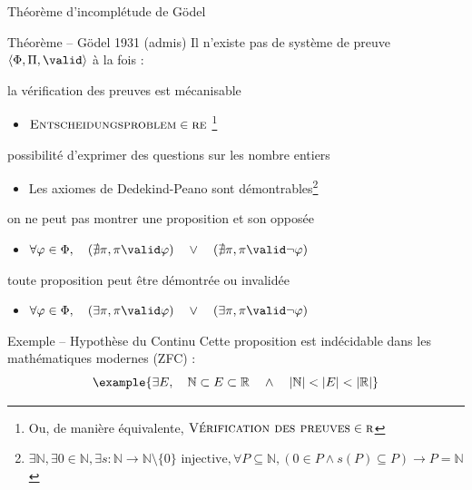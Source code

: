 
\begingroup

\begin{frame}{Théorème d'incomplétude de Gödel}

    \vspace{-2mm}
  \begin{block}{Théorème -- Gödel 1931 (admis)}
    Il n'existe pas de système de preuve $\langle \Phi, \Pi, \valid \rangle$ à la fois : 
    \begin{description}
    \item[Formel :] la vérification des preuves est mécanisable
      \begin{itemize}
      \item $\textsc{Entscheidungsproblem} \in \textsc{re}$
        \footnote{Ou, de manière équivalente, $\textsc{Vérification des preuves} \in \textsc{r}$}
      \end{itemize}
    \item[Peano expressif :] possibilité d'exprimer des questions sur les nombre entiers
      \begin{itemize}
      \item Les axiomes de Dedekind-Peano sont démontrables\footnote{$\exists \mathbb{N},\exists 0 \in \mathbb{N}, \exists s :\mathbb{N} \rightarrow {\mathbb{N}\setminus \{0\}} \text{ injective}, \forall P\subseteq \mathbb{N}, (0 \in P \land s(P) \subseteq P) \rightarrow P=\mathbb{N}$}
      \end{itemize}
    \item[Cohérent :] on ne peut pas montrer une proposition et son opposée
      \begin{itemize}
      \item $\forall \varphi\in \Phi,\quad(\nexists \pi, \pi \valid \varphi) \quad \lor\quad (\nexists \pi, \pi \valid \lnot\varphi)$
      \end{itemize}
    \item[Complet :] toute proposition peut être démontrée ou invalidée
      \begin{itemize}
      \item $\forall \varphi\in \Phi,\quad (\exists \pi, \pi \valid \varphi) \quad \lor\quad (\exists \pi, \pi \valid \lnot\varphi)$
      \end{itemize}
    \end{description}
  \end{block}
  
  \pause
    \vspace{-2mm}
  \begin{exampleblock}{Exemple -- Hypothèse du Continu}
    Cette proposition est indécidable dans les mathématiques modernes (ZFC) :
    \vspace{-1mm}
    $$\example{\exists E,\quad \mathbb{N} \subset E \subset \mathbb{R} \quad\land\quad |\mathbb{N}| < |E| < |\mathbb{R}|}$$ 

    \vspace{-3mm}
  \end{exampleblock}
  
\end{frame}

\endgroup
\endinput
